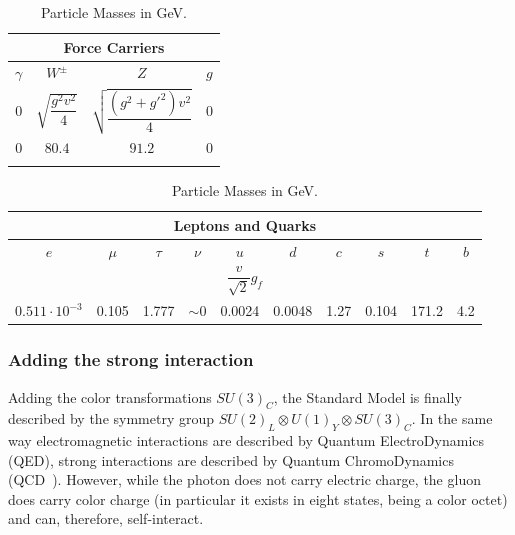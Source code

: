 \begin{table}[htb]\centering
\begin{tabular}{cccc}\toprule
\multicolumn{4}{c}{Force Carriers} \\ \midrule
$\gamma $ &$W^{\pm}$ &$Z$ &$g$ \\
$0$ & $\sqrt{\dfrac{g^{2}v^{2}}{4}} $& $\sqrt{\dfrac{(g^{2}+g'^{2})v^{2}}{4}} $&  $0$ \\
$0$ & $80.4$ & $91.2$ & $0$ \\\bottomrule\\
\end{tabular}
\begin{tabular}{cccccccccc}\toprule
\multicolumn{10}{c}{Leptons and Quarks} \\ \midrule
$e$ & $\mu$ &$\tau$ &$\nu$ & $u$ & $d$ & $c$ & $s$ &$ t$ & $b$ \\
\multicolumn{10}{c}{$\dfrac{v}{\sqrt{2}}g_{f}$} \\
$0.511\cdot10^{-3} $ & 0.105 & 1.777 & $\sim0$ & 0.0024 & 0.0048 & 1.27 & 0.104 & 171.2 & 4.2 \\\bottomrule
\end{tabular}\caption{Particle Masses in GeV.}\label{tab:mass} \end{table}


\subsubsection{Adding the strong interaction}\label{sec:qcdlagr}

Adding the color transformations $SU(3)_{C}$, the Standard Model is
finally described by the symmetry group 
$SU(2)_{L}\otimes U(1)_{Y}\otimes SU(3)_{C}$.
In the same way electromagnetic interactions are 
described by Quantum ElectroDynamics (QED), 
strong interactions are described by Quantum ChromoDynamics (QCD~\cite{Ecker}).
However, while the photon does not carry electric charge,
the gluon does carry color charge (in particular it exists in
eight states, being a color octet) and can, therefore, self-interact.

